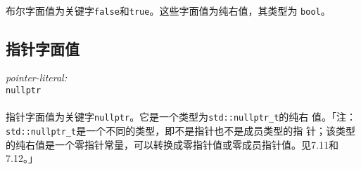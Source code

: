 \paragraph{}
布尔字面值为关键字\texttt{false}和\texttt{true}。这些字面值为纯右值，其类型为
\texttt{bool}。

\subsection{指针字面值}
\noindent \mbox{\qquad \textit{pointer-literal:}}                             \\
\mbox{\qquad \qquad \texttt{nullptr}}

\paragraph{}
指针字面值为关键字\texttt{nullptr}。它是一个类型为\texttt{std::nullptr\_t}的纯右
值。「注：\texttt{std::nullptr\_t}是一个不同的类型，即不是指针也不是成员类型的指
针；该类型的纯右值是一个零指针常量，可以转换成零指针值或零成员指针值。见7.11和
7.12。」

